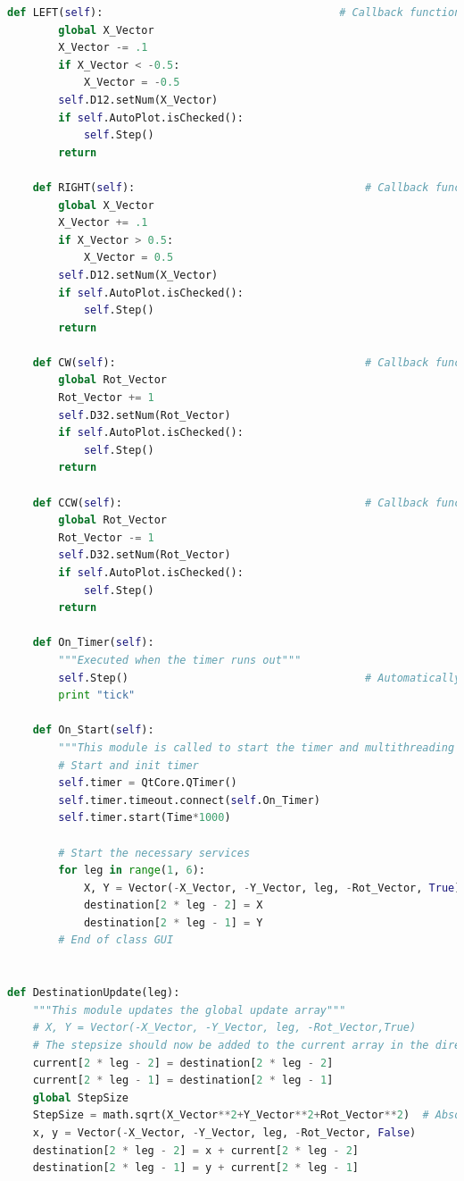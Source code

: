 \begin{lstlisting}[language = python]
    def LEFT(self):                                     # Callback function for Button
        global X_Vector
        X_Vector -= .1
        if X_Vector < -0.5:
            X_Vector = -0.5
        self.D12.setNum(X_Vector)
        if self.AutoPlot.isChecked():
            self.Step()
        return

    def RIGHT(self):                                    # Callback function for Button
        global X_Vector
        X_Vector += .1
        if X_Vector > 0.5:
            X_Vector = 0.5
        self.D12.setNum(X_Vector)
        if self.AutoPlot.isChecked():
            self.Step()
        return

    def CW(self):                                       # Callback function for Button
        global Rot_Vector
        Rot_Vector += 1
        self.D32.setNum(Rot_Vector)
        if self.AutoPlot.isChecked():
            self.Step()
        return

    def CCW(self):                                      # Callback function for Button
        global Rot_Vector
        Rot_Vector -= 1
        self.D32.setNum(Rot_Vector)
        if self.AutoPlot.isChecked():
            self.Step()
        return

    def On_Timer(self):
        """Executed when the timer runs out"""
        self.Step()                                     # Automatically take the next step
        print "tick"

    def On_Start(self):
        """This module is called to start the timer and multithreading services"""
        # Start and init timer
        self.timer = QtCore.QTimer()
        self.timer.timeout.connect(self.On_Timer)
        self.timer.start(Time*1000)

        # Start the necessary services
        for leg in range(1, 6):
            X, Y = Vector(-X_Vector, -Y_Vector, leg, -Rot_Vector, True)
            destination[2 * leg - 2] = X
            destination[2 * leg - 1] = Y
        # End of class GUI


def DestinationUpdate(leg):
    """This module updates the global update array"""
    # X, Y = Vector(-X_Vector, -Y_Vector, leg, -Rot_Vector,True)
    # The stepsize should now be added to the current array in the direction of movement
    current[2 * leg - 2] = destination[2 * leg - 2]
    current[2 * leg - 1] = destination[2 * leg - 1]
    global StepSize
    StepSize = math.sqrt(X_Vector**2+Y_Vector**2+Rot_Vector**2)  # Absolute stepsize from input vectors
    x, y = Vector(-X_Vector, -Y_Vector, leg, -Rot_Vector, False)
    destination[2 * leg - 2] = x + current[2 * leg - 2]
    destination[2 * leg - 1] = y + current[2 * leg - 1]


\end{lstlisting}
